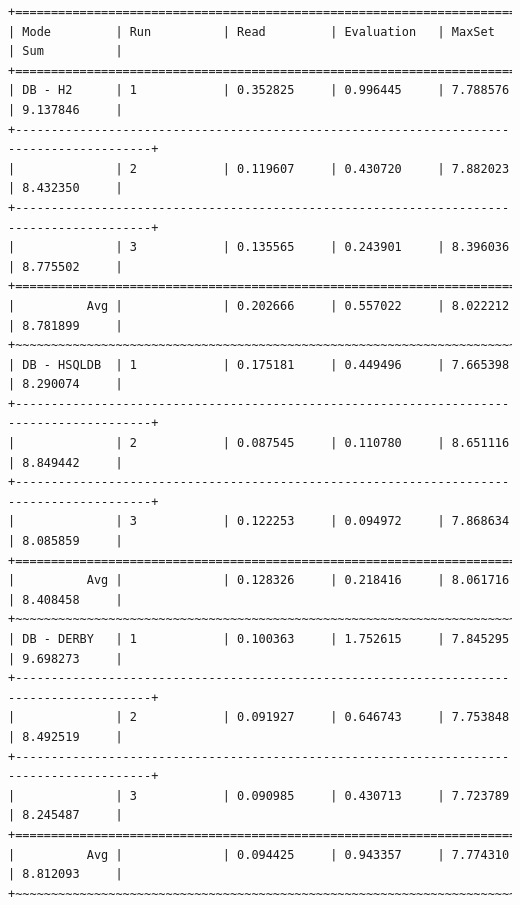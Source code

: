 \documentclass[draft,final]{vutinfth} %
\begin{document}
\begin{lstlisting}[basicstyle=\tiny,caption={Benchmark DB \textbf{mit} Indizes, Datei: lubm-ex-20-15.sparql.xml},label={lst:dbmi15}]
+=========================================================================================+
| Mode         | Run          | Read         | Evaluation   | MaxSet       | Sum          | 
+=========================================================================================+
| DB - H2      | 1            | 0.352825     | 0.996445     | 7.788576     | 9.137846     | 
+-----------------------------------------------------------------------------------------+
|              | 2            | 0.119607     | 0.430720     | 7.882023     | 8.432350     | 
+-----------------------------------------------------------------------------------------+
|              | 3            | 0.135565     | 0.243901     | 8.396036     | 8.775502     | 
+=========================================================================================+
|          Avg |              | 0.202666     | 0.557022     | 8.022212     | 8.781899     | 
+~~~~~~~~~~~~~~~~~~~~~~~~~~~~~~~~~~~~~~~~~~~~~~~~~~~~~~~~~~~~~~~~~~~~~~~~~~~~~~~~~~~~~~~~~+
| DB - HSQLDB  | 1            | 0.175181     | 0.449496     | 7.665398     | 8.290074     | 
+-----------------------------------------------------------------------------------------+
|              | 2            | 0.087545     | 0.110780     | 8.651116     | 8.849442     | 
+-----------------------------------------------------------------------------------------+
|              | 3            | 0.122253     | 0.094972     | 7.868634     | 8.085859     | 
+=========================================================================================+
|          Avg |              | 0.128326     | 0.218416     | 8.061716     | 8.408458     | 
+~~~~~~~~~~~~~~~~~~~~~~~~~~~~~~~~~~~~~~~~~~~~~~~~~~~~~~~~~~~~~~~~~~~~~~~~~~~~~~~~~~~~~~~~~+
| DB - DERBY   | 1            | 0.100363     | 1.752615     | 7.845295     | 9.698273     | 
+-----------------------------------------------------------------------------------------+
|              | 2            | 0.091927     | 0.646743     | 7.753848     | 8.492519     | 
+-----------------------------------------------------------------------------------------+
|              | 3            | 0.090985     | 0.430713     | 7.723789     | 8.245487     | 
+=========================================================================================+
|          Avg |              | 0.094425     | 0.943357     | 7.774310     | 8.812093     | 
+~~~~~~~~~~~~~~~~~~~~~~~~~~~~~~~~~~~~~~~~~~~~~~~~~~~~~~~~~~~~~~~~~~~~~~~~~~~~~~~~~~~~~~~~~+
\end{lstlisting}
\end{document}
